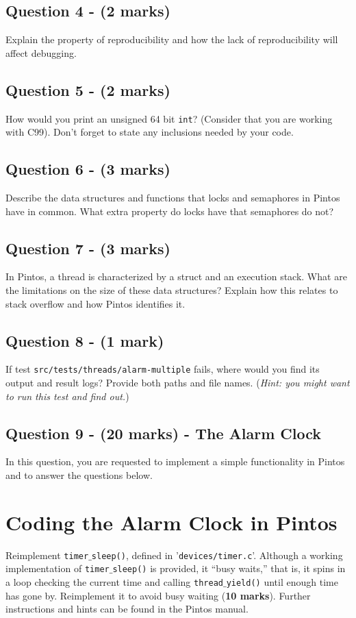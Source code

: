 \documentclass[a4paper,12pt]{article}
\begin{document}
\subsection*{Question 4 - (2 marks)}
Explain the property of reproducibility and how the lack of reproducibility will affect debugging.

\subsection*{Question 5 - (2 marks)}
How would you print an unsigned 64 bit \texttt{int}? 
(Consider that you are working with C99). 
Don't forget to state any inclusions needed by your code.

\subsection*{Question 6 - (3 marks)}
Describe the data structures and functions that locks and semaphores in Pintos have in common. 
What extra property do locks have that semaphores do not?

\subsection*{Question 7 - (3 marks)}
In Pintos, a thread is characterized by a struct and an execution stack. 
What are the limitations on the size of these data structures? 
Explain how this relates to stack overflow and how Pintos identifies it.

\subsection*{Question 8 - (1 mark)}
If test \texttt{src/tests/threads/alarm-multiple} fails, where would you find its output and result logs? 
Provide both paths and file names.
(\textit{Hint: you might want to run this test and find out.}) 

\subsection*{Question 9 - (20 marks) - The Alarm Clock}
In this question, you are requested to implement a simple functionality in Pintos and to answer the questions below.

\section*{Coding the Alarm Clock in Pintos} 
Reimplement \texttt{timer$\_$sleep()}, defined in '\texttt{devices/timer.c}’. 
Although a working implementation of \texttt{timer$\_$sleep()} is provided, it “busy waits,” that is, it spins in a loop checking the current time and calling \texttt{thread$\_$yield()} until enough time has gone by. 
Reimplement it to avoid busy waiting ({\bf 10 marks}). 
Further instructions and hints can be found in the Pintos manual.
\end{document}
